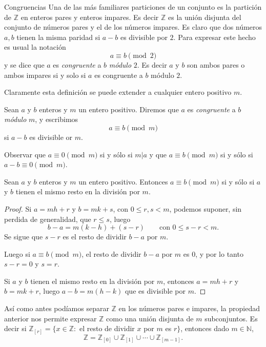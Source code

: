 \begin{section}{Congruencias}
Una de las más familiares particiones de un conjunto es la partición de $\mathbb Z$ en enteros pares y enteros impares. Es decir $\mathbb Z$ es la unión disjunta del conjunto de números pares y el de los números impares. Es claro que dos números $a,b$ tienen la misma paridad si $a-b$ es divisible por $2$. Para expresar este hecho es usual la notación
$$
a\equiv b \pmod2
$$
y se dice que $a$ es \textit{congruente } a $b$ \textit{módulo} $2$. Es decir $a$ y $b$ son ambos pares o ambos impares si y solo si $a$ es congruente a $b$ módulo $2$.

Claramente esta definición se puede extender a cualquier entero positivo $m$.

\begin{definicion} Sean $a$ y $b$ enteros y $m$ un entero positivo. Diremos que $a$ es {\em congruente} a $b$  {\em módulo} $m$, y escribimos  
$$
a \equiv b \pmod{m}
$$
si $a-b$ es divisible or $m$.
\end{definicion}

Observar que $a\equiv 0 \pmod{m}$ si  y sólo si $m|a$ y que $a\equiv b \pmod{m}$ si y sólo si $a-b\equiv 0 \pmod{m}$. 


\begin{proposicion}
Sean $a$ y $b$ enteros y $m$ un entero positivo. Entonces $a\equiv b \pmod{m}$ si  y sólo si $a$ y $b$ tienen el mismo resto en la división por $m$.
\end{proposicion}
\begin{proof}
Si $a=mh+r$ y $b=mk+s$, con $0 \le r,s <m$, podemos suponer, sin perdida de generalidad, que $r \le s$, luego
$$
b-a= m(k-h) + (s-r) \qquad \text{con $0\le s - r < m$}.
$$
Se sigue que $s-r$ es el resto de dividir $b-a$ por $m$.

Luego si $a\equiv b \pmod{m}$, el resto de dividir   $b-a$ por $m$ es 0, y por lo tanto $s-r=0$ y $s=r$.

Si $a$ y $b$ tienen el mismo resto en la división por $m$, entonces  $a=mh+r$ y $b=mk+r$, luego $a-b = m(h-k)$ que es divisible por $m$.
\end{proof}

Así como antes podíamos separar $\mathbb Z$ en los números pares e impares, la propiedad anterior nos permite expresar $\mathbb Z$ como una unión disjunta de $m$ subconjuntos. Es decir si $\mathbb  Z_{[r]} =\{x \in \mathbb Z:$ el resto de dividir $x$ por $m$ es $r\}$, entonces dado $m \in \mathbb N$, 
$$
\mathbb Z= \mathbb Z_{[0]}\cup \mathbb Z_{[1]}\cup \cdots\cup \mathbb Z_{[m-1]}.
$$


\end{section}
